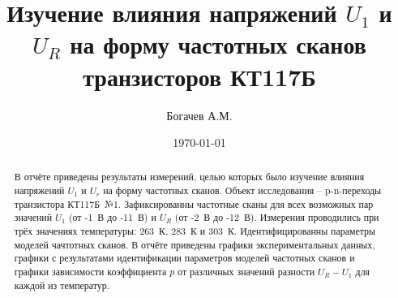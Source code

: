 \documentclass[14pt]{extarticle}
\title{Изучение влияния напряжений $U_1$ и $U_R$ на форму частотных 
сканов транзисторов КТ117Б}
\author{Богачев А.М.}
\date{\today}
\begin{document}
    \maketitle
    \begin{abstract}
        В отчёте приведены результаты измерений, целью которых было
        изучение влияния напряжений $U_1$ и $U_r$ на форму частотных 
        сканов. Объект исследования -- p-n-переходы транзистора 
        КТ117Б~№1. Зафиксированны частотные сканы для всех возможных пар
        значений $U_1$ (от -1~В до -11~В) и $U_R$ (от -2~В до -12~В). 
        Измерения проводились при трёх значениях температуры: 263~К, 
        283~К и 303~К. Идентифицированны параметры моделей чачтотных 
        сканов. В отчёте приведены графики экспериментальных данных, 
        графики с результатами идентификации параметров моделей частотных 
        сканов и графики зависимости коэффициента $p$ от различных 
        значений разности $U_R - U_1$ для каждой из температур.
    \end{abstract}

    

    
\end{document}

